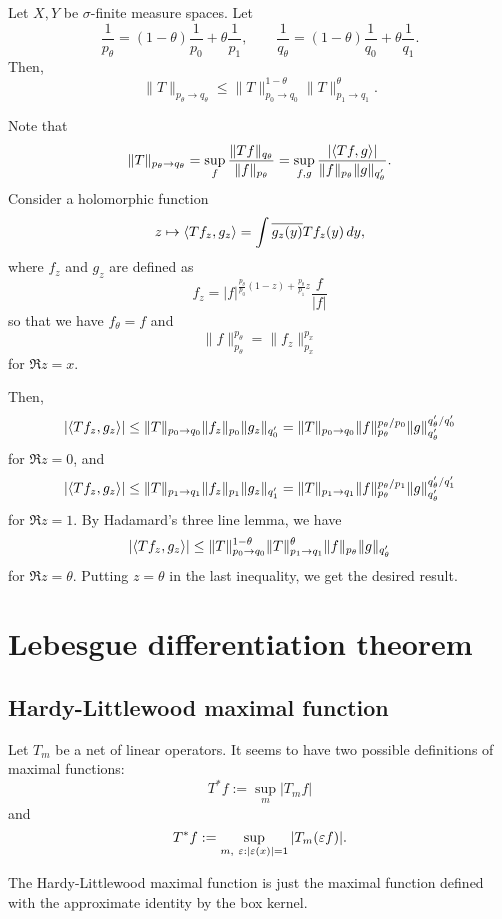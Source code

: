 \documentclass{../../large}
\begin{document}
\begin{prb}
Let $X,Y$ be $\sigma$-finite measure spaces.
Let
\[\frac1{p_\theta}=(1-\theta)\frac1{p_0}+\theta\frac1{p_1},\qquad\frac1{q_\theta}=(1-\theta)\frac1{q_0}+\theta\frac1{q_1}.\]
Then,
\[\|T\|_{p_\theta\to q_\theta}\le\|T\|_{p_0\to q_0}^{1-\theta}\|T\|_{p_1\to q_1}^\theta.\]
\end{prb}
\begin{pf}
Note that
\[\|T\|_{p_\theta\to q_\theta}=\sup_f\frac{\|Tf\|_{q_\theta}}{\|f\|_{p_\theta}}=\sup_{f,g}\frac{|\langle Tf,g\rangle|}{\|f\|_{p_\theta}\|g\|_{q'_\theta}}.\]
Consider a holomorphic function
\[z\mapsto\langle Tf_z,g_z\rangle=\int\overline{g_z(y)}Tf_z(y)\,dy,\]
where $f_z$ and $g_z$ are defined as
\[f_z=|f|^{\frac{p_\theta}{p_0}(1-z)+\frac{p_\theta}{p_1}z}\frac f{|f|}\]
so that we have $f_\theta=f$ and
\[\|f\|_{p_\theta}^{p_\theta}=\|f_z\|_{p_x}^{p_x}\]
for $\Re z=x$.

Then,
\[|\langle Tf_z,g_z\rangle|\le\|T\|_{p_0\to q_0}\|f_z\|_{p_0}\|g_z\|_{q'_0}=\|T\|_{p_0\to q_0}\|f\|_{p_\theta}^{p_\theta/p_0}\|g\|_{q'_\theta}^{q'_\theta/q'_0}\]
for $\Re z=0$, and
\[|\langle Tf_z,g_z\rangle|\le\|T\|_{p_1\to q_1}\|f_z\|_{p_1}\|g_z\|_{q'_1}=\|T\|_{p_1\to q_1}\|f\|_{p_\theta}^{p_\theta/p_1}\|g\|_{q'_\theta}^{q'_\theta/q'_1}\]
for $\Re z=1$.
By Hadamard's three line lemma, we have
\[|\langle Tf_z,g_z\rangle|\le\|T\|_{p_0\to q_0}^{1-\theta}\|T\|_{p_1\to q_1}^\theta\|f\|_{p_\theta}\|g\|_{q'_\theta}\]
for $\Re z=\theta$.
Putting $z=\theta$ in the last inequality, we get the desired result.
\end{pf}





\chapter{Lebesgue differentiation theorem}

\section{Hardy-Littlewood maximal function}

Let $T_m$ be a net of linear operators.
It seems to have two possible definitions of maximal functions:
\[T^*f:=\sup_m|T_mf|\]
and
\[T^*f:=\sup_{m,\ \varepsilon:|\varepsilon(x)|=1}|T_m(\varepsilon f)|.\]

\begin{prb}
The Hardy-Littlewood maximal function is just the maximal function defined with the approximate identity by the box kernel.
\end{prb}
\end{document}
